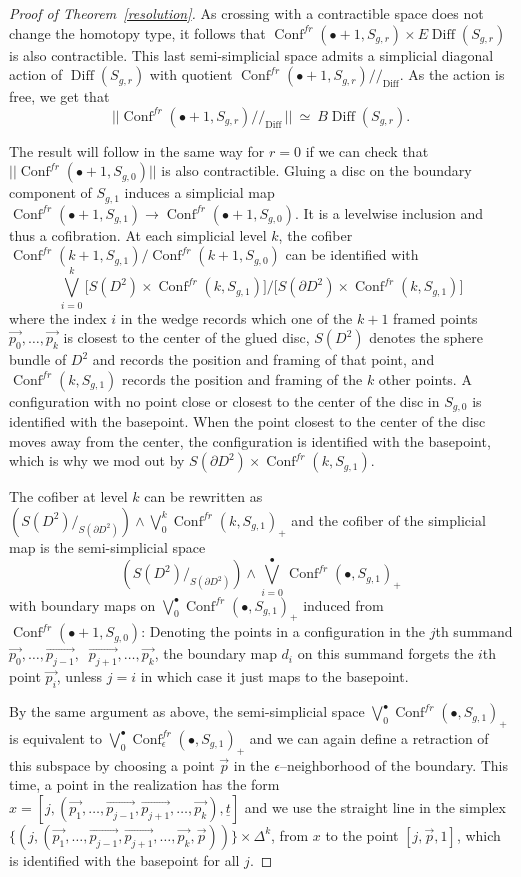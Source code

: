 \documentclass[10pt]{amsart}
\newcommand{\De}{\Delta}
\newcommand{\x}{\times}
\newcommand{\del}{\partial}
\newcommand{\Dif}{\operatorname{Diff}}
\newcommand{\Conf}{\operatorname{Conf}^{fr}}
\begin{document}
\begin{proof}[Proof of Theorem~\ref{resolution}]
As crossing with a contractible space does not change the homotopy type, 
it follows that $ \Conf(\bullet +1 ,S_{g,r})\x E\Dif(S_{g,r})$ is also contractible.
This last semi-simplicial space admits a simplicial diagonal action of
$\Dif(S_{g,r})$ with quotient $ \Conf(\bullet+1,S_{g,r})/\!\!/_{\Dif}$. 
As the action is free, we get that 
$$||\Conf(\bullet+1,S_{g,r})/\!\!/_{\Dif}\,||\ \simeq\ B\Dif(S_{g,r}).$$



\smallskip


The result will follow in the same way for $r=0$ if we can check that  $||\Conf(\bullet+1,S_{g,0})||$ is also contractible.
Gluing a disc on the boundary
component of $S_{g,1}$ induces a simplicial map 
$\Conf(\bullet+1,S_{g,1})\to \Conf(\bullet+1,S_{g,0})$. 
It is a levelwise inclusion and thus a cofibration. 
At each simplicial level $k$, the cofiber $\Conf(k+1,S_{g,1})\big/\Conf(k+1,S_{g,0})$ can be identified with 
$$\bigvee_{i=0}^k\big[S(D^2)\x\Conf(k,S_{g,1})\big]\Big/\big[S(\del D^2)\x\Conf(k,S_{g,1})\big]$$
where the index $i$ in the wedge records which one of the $k+1$ framed points $\overrightarrow{p_0},\dots,\overrightarrow{p_k}$ 
is closest to the center of the glued disc, 
$S(D^2)$ denotes the sphere bundle of $D^2$ and records the position and framing of that point, and 
$\Conf(k,S_{g,1})$ records the position and framing of the $k$ other points.  
A configuration with no point close or closest to the center of the disc in
$S_{g,0}$ is identified with the basepoint. 
When the point closest to the center of the disc moves away from the center, the configuration is identified
with the basepoint, which is why we mod out by $S(\del D^2)\x\Conf(k,S_{g,1})$.

The cofiber at level $k$ can be rewritten as $(S(D^2)/_{S(\del D^2)})\wedge\bigvee_{0}^k\Conf(k,S_{g,1})_+$ and 
the cofiber of the simplicial map is the semi-simplicial space 
$$(S(D^2)/_{S(\del D^2)})\wedge\bigvee_{i=0}^\bullet\Conf(\bullet,S_{g,1})_+$$ with boundary maps 
on $\bigvee_{0}^\bullet\Conf(\bullet,S_{g,1})_+$ induced from  
$\Conf(\bullet+1,S_{g,0})$: Denoting the points in a configuration in the $j$th summand 
$\overrightarrow{p_0},\dots,\overrightarrow{p_{j-1}},\ $ $\overrightarrow{p_{j+1}},\dots,\overrightarrow{p_k}$, the boundary map $d_i$ on this summand forgets 
the $i$th point $\overrightarrow{p_i}$, unless $j=i$ in which case it just maps to the basepoint. 

By the same argument as above, 
the semi-simplicial space $\bigvee_{0}^\bullet\Conf(\bullet,S_{g,1})_+$ 
is equivalent to $\bigvee_{0}^\bullet\Conf_\epsilon(\bullet,S_{g,1})_+$
 and we can again define a retraction of this subspace by
choosing a point $\overrightarrow{p}$ in the $\epsilon$--neighborhood of the boundary. This time, a point in the realization has the
form  $x=[j,(\overrightarrow{p_1},\dots,\overrightarrow{p_{j-1}},\overrightarrow{p_{j+1}},\dots,\overrightarrow{p_k}),\underline{t}]$ and we use the straight line in the
simplex
$\{(j,(\overrightarrow{p_1},\dots,\overrightarrow{p_{j-1}},\overrightarrow{p_{j+1}},\dots,\overrightarrow{p_k},\overrightarrow{p}))\} \x \De^k$, from $x$ to the point
$[j,\overrightarrow{p},1]$, which is identified with the basepoint for all $j$.


\end{proof}
\end{document}
